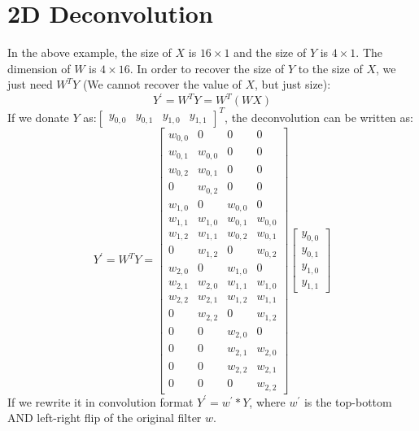 \documentclass{article}
\begin{document}
\section{2D Deconvolution}
In the above example, the size of $X$ is $16\times 1$ and the size of $Y$ is $4\times 1$. The dimension of $W$ is $4\times 16$. In order to recover the size of $Y$ to the size of $X$, we just need $W^TY$ (We cannot recover the value of $X$, but just size):
\[
Y^\prime = W^TY = W^T(WX)
\]
If we donate $Y$ as:$
\begin{bmatrix}
y_{0,0} & y_{0,1} & y_{1,0} & y_{1,1}
\end{bmatrix}^T
$, the deconvolution can be written as:
\[
Y^\prime = W^TY = 
\begin{bmatrix}
w_{0,0} & 0 & 0 & 0 \\ w_{0,1} & w_{0,0} & 0 & 0 \\
w_{0,2} & w_{0,1} & 0 & 0 \\ 0 & w_{0,2} & 0 & 0 \\
w_{1,0} & 0 & w_{0,0} & 0 \\ w_{1,1} & w_{1,0} & w_{0,1} & w_{0,0}\\
w_{1,2} & w_{1,1} & w_{0,2} & w_{0,1} \\ 0 & w_{1,2} & 0 & w_{0,2}\\
w_{2,0} & 0 & w_{1,0} & 0 \\ w_{2,1} & w_{2,0} & w_{1,1} & w_{1,0}\\
w_{2,2} & w_{2,1} & w_{1,2} & w_{1,1} \\ 0 & w_{2,2} & 0 & w_{1,2}\\
0 & 0 & w_{2,0} & 0 \\ 0 & 0 & w_{2,1} & w_{2,0} \\
0 & 0 & w_{2,2} & w_{2,1} \\ 0 & 0 & 0 & w_{2,2}
\end{bmatrix}
\begin{bmatrix}
y_{0,0} \\ y_{0,1} \\ y_{1,0} \\ y_{1,1}
\end{bmatrix}
\]
If we rewrite it in convolution format $Y^\prime=w^\prime*Y$, where $w^\prime$ is the top-bottom AND left-right flip of the original filter $w$.
\end{document}
